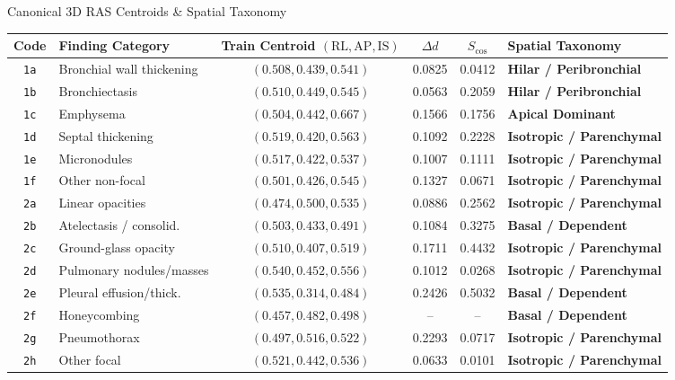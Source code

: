 \documentclass[aspectratio=169, 10pt]{beamer}
\begin{document}
\begin{frame}{Canonical 3D RAS Centroids \& Spatial Taxonomy}
    \centering
    \scriptsize
    \setlength{\tabcolsep}{7pt}
    \begin{tabular}{clccc>{\bfseries}l}
        \toprule
        \textbf{Code} & \textbf{Finding Category} & \textbf{Train Centroid $(\text{RL}, \text{AP}, \text{IS})$} & $\Delta d$ & $S_{\text{cos}}$ & Spatial Taxonomy \\
        \midrule
        \texttt{1a} & Bronchial wall thickening & $(0.508, 0.439, 0.541)$ & 0.0825 & 0.0412 & Hilar / Peribronchial \\
        \texttt{1b} & Bronchiectasis           & $(0.510, 0.449, 0.545)$ & 0.0563 & 0.2059 & Hilar / Peribronchial \\
        \rowcolor{darkblue!10}
        \texttt{1c} & Emphysema                & $(0.504, 0.442, 0.667)$ & 0.1566 & 0.1756 & Apical Dominant \\
        \texttt{1d} & Septal thickening        & $(0.519, 0.420, 0.563)$ & 0.1092 & 0.2228 & Isotropic / Parenchymal \\
        \texttt{1e} & Micronodules             & $(0.517, 0.422, 0.537)$ & 0.1007 & 0.1111 & Isotropic / Parenchymal \\
        \texttt{1f} & Other non-focal          & $(0.501, 0.426, 0.545)$ & 0.1327 & 0.0671 & Isotropic / Parenchymal \\
        \texttt{2a} & Linear opacities         & $(0.474, 0.500, 0.535)$ & 0.0886 & 0.2562 & Isotropic / Parenchymal \\
        \rowcolor{darkblue!10}
        \texttt{2b} & Atelectasis / consolid.  & $(0.503, 0.433, 0.491)$ & 0.1084 & 0.3275 & Basal / Dependent \\
        \texttt{2c} & Ground-glass opacity     & $(0.510, 0.407, 0.519)$ & 0.1711 & 0.4432 & Isotropic / Parenchymal \\
        \texttt{2d} & Pulmonary nodules/masses & $(0.540, 0.452, 0.556)$ & 0.1012 & 0.0268 & Isotropic / Parenchymal \\
        \rowcolor{darkblue!10}
        \texttt{2e} & Pleural effusion/thick.  & $(0.535, 0.314, 0.484)$ & 0.2426 & 0.5032 & Basal / Dependent \\
        \texttt{2f} & Honeycombing             & $(0.457, 0.482, 0.498)$ & -- & -- & Basal / Dependent \\
        \texttt{2g} & Pneumothorax             & $(0.497, 0.516, 0.522)$ & 0.2293 & 0.0717 & Isotropic / Parenchymal \\
        \texttt{2h} & Other focal              & $(0.521, 0.442, 0.536)$ & 0.0633 & 0.0101 & Isotropic / Parenchymal \\
        \bottomrule
    \end{tabular}


\end{frame}
\end{document}
